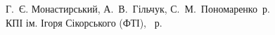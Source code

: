{\begin{alwayssingle}
%
%

		\vfill

	\hfill
	\begin{minipage}[t]{0.45\linewidth}\small
        \textcopyright{} Г.~Є. Монастирський, А.~В.~Гільчук, С.~М.~Пономаренко \the\year\,р.\\
        \textcopyright{} КПІ ім. Ігоря Сікорського (ФТІ), \the\year~р.
    \end{minipage}
		\newpage%
	\end{alwayssingle}
}

